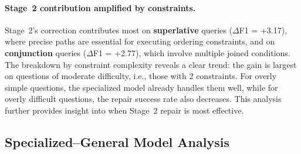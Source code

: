 \documentclass[11pt]{article}
\begin{document}
\paragraph{Stage~2 contribution amplified by constraints.}
Stage~2's correction contributes most on \textbf{superlative} queries ($\Delta$F1 = +3.17), where precise paths are essential for executing ordering constraints, and on \textbf{conjunction} queries ($\Delta$F1 = +2.77), which involve multiple joined conditions. The breakdown by constraint complexity reveals a clear trend: the gain is largest on questions of moderate difficulty, i.e., those with 2 constraints. For overly simple questions, the specialized model already handles them well, while for overly difficult questions, the repair success rate also decreases. This analysis further provides insight into when Stage~2 repair is most effective.


\subsection{Specialized--General Model Analysis}
\label{sec:model_type}

\begin{table}[t]
\centering
\small
\setlength{\tabcolsep}{3pt}
\caption{Impact of model choice in RouterKGQA's specialized and general roles.}
\label{tab:irc_llm_webqsp_cwq}
\end{table}
\end{document}
